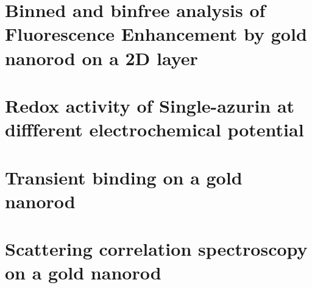 \chapter{Binned and binfree analysis of Fluorescence Enhancement by gold nanorod on a 2D layer}

\chapter{Redox activity of Single-azurin at diffferent electrochemical potential}

\chapter{Transient binding on a gold nanorod}

\chapter{Scattering correlation spectroscopy on a gold nanorod}